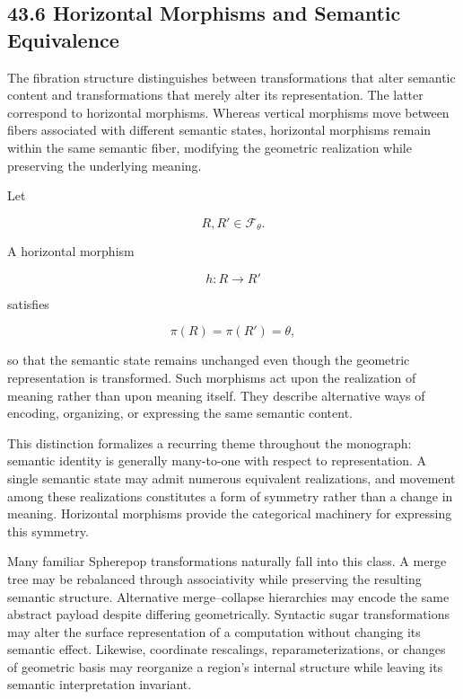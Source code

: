 \documentclass[12pt,letterpaper]{article}
\theoremstyle{remark}
\begin{document}
\subsection{43.6 Horizontal Morphisms and Semantic Equivalence}

The fibration structure distinguishes between transformations that alter semantic content and transformations that merely alter its representation. The latter correspond to horizontal morphisms. Whereas vertical morphisms move between fibers associated with different semantic states, horizontal morphisms remain within the same semantic fiber, modifying the geometric realization while preserving the underlying meaning.

Let

\[
R, R' \in \mathcal{F}_{\theta}.
\]

A horizontal morphism

\[
h : R \to R'
\]

satisfies

\[
\pi(R) = \pi(R') = \theta,
\]

so that the semantic state remains unchanged even though the geometric representation is transformed. Such morphisms act upon the realization of meaning rather than upon meaning itself. They describe alternative ways of encoding, organizing, or expressing the same semantic content.

This distinction formalizes a recurring theme throughout the monograph: semantic identity is generally many-to-one with respect to representation. A single semantic state may admit numerous equivalent realizations, and movement among these realizations constitutes a form of symmetry rather than a change in meaning. Horizontal morphisms provide the categorical machinery for expressing this symmetry.

Many familiar Spherepop transformations naturally fall into this class. A merge tree may be rebalanced through associativity while preserving the resulting semantic structure. Alternative merge--collapse hierarchies may encode the same abstract payload despite differing geometrically. Syntactic sugar transformations may alter the surface representation of a computation without changing its semantic effect. Likewise, coordinate rescalings, reparameterizations, or changes of geometric basis may reorganize a region's internal structure while leaving its semantic interpretation invariant.
\end{document}
